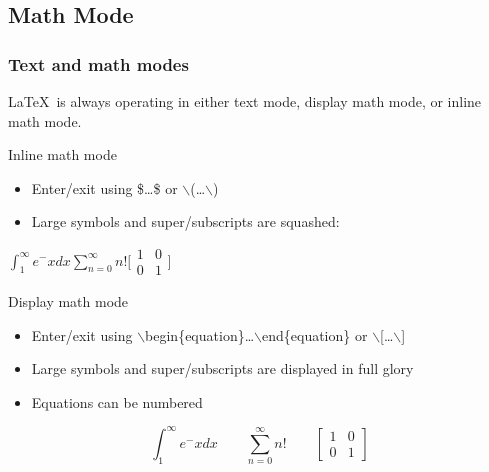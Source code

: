 \documentclass[ignorenonframetext]{beamer}
\begin{document}
\subsection{Math Mode}
\begin{frame}
  \frametitle{Text and math modes}
  \LaTeX\ is always operating in either text mode, display math mode,
  or inline math mode.
  \begin{block}{Inline math mode}
    \begin{itemize}
    \item Enter/exit using \$\ldots\$ or $\backslash$(\ldots$\backslash$)
    \item Large symbols and super/subscripts are squashed:
    \end{itemize}
    \begin{center}\vspace{-0.5em}$\int_1^\infty e^-x dx$\qquad$\sum_{n=0}^\infty n!$\qquad$\big[\begin{smallmatrix}1 & 0 \\ 0 & 1\end{smallmatrix}\big]$\end{center}
  \end{block}
  \begin{block}{Display math mode}
    \begin{itemize}
    \item Enter/exit using $\backslash$begin\{equation\}\ldots$\backslash$end\{equation\} or $\backslash$[\ldots$\backslash$]
    \item Large symbols and super/subscripts are displayed in full glory
    \item Equations can be numbered
    \end{itemize}
    \[\int_1^\infty e^-x dx\qquad\sum_{n=0}^\infty n!\qquad\begin{bmatrix}1 & 0 \\ 0 & 1\end{bmatrix}\]
  \end{block}
\end{frame}
\end{document}
